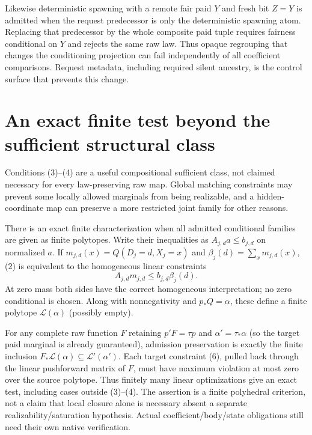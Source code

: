 \documentclass[11pt]{article}
\begin{document}
Likewise deterministic spawning with a remote fair paid $Y$ and fresh bit $Z=Y$ is admitted when the request predecessor is only the deterministic spawning atom. Replacing that predecessor by the whole composite paid tuple requires fairness conditional on $Y$ and rejects the same raw law. Thus opaque regrouping that changes the conditioning projection can fail independently of all coefficient comparisons. Request metadata, including required silent ancestry, is the control surface that prevents this change.

\section{An exact finite test beyond the sufficient structural class}
Conditions (3)--(4) are a useful compositional sufficient class, not claimed necessary for every law-preserving raw map. Global matching constraints may prevent some locally allowed marginals from being realizable, and a hidden-coordinate map can preserve a more restricted joint family for other reasons.

There is an exact finite characterization when all admitted conditional families are given as finite polytopes. Write their inequalities as $A_{j,d}a\leq b_{j,d}$ on normalized $a$. If $m_{j,d}(x)=Q(D_j=d,X_j=x)$ and $\beta_j(d)=\sum_xm_{j,d}(x)$, (2) is equivalent to the homogeneous linear constraints
\[
                    A_{j,d}m_{j,d}\leq b_{j,d}\beta_j(d). \tag{6}
\]
At zero mass both sides have the correct homogeneous interpretation; no zero conditional is chosen. Along with nonnegativity and $p_*Q=\alpha$, these define a finite polytope $\mathcal L(\alpha)$ (possibly empty).

For any complete raw function $F$ retaining $p'F=\tau p$ and $\alpha'=\tau_*\alpha$ (so the target paid marginal is already guaranteed), admission preservation is exactly the finite inclusion $F_*\mathcal L(\alpha)\subseteq\mathcal L'(\alpha')$. Each target constraint (6), pulled back through the linear pushforward matrix of $F$, must have maximum violation at most zero over the source polytope. Thus finitely many linear optimizations give an exact test, including cases outside (3)--(4). The assertion is a finite polyhedral criterion, not a claim that local closure alone is necessary absent a separate realizability/saturation hypothesis. Actual coefficient/body/state obligations still need their own native verification.
\end{document}
